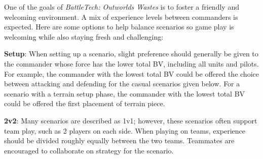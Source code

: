 One of the goals of \emph{BattleTech: Outworlds Wastes} is to foster a friendly and welcoming environment.
A mix of experience levels between commanders is expected.
Here are some options to help balance scenarios so game play is welcoming while also staying fresh and challenging:

\begin{description}

\item {\bfseries Setup}: When setting up a scenario, slight preference should generally be given to the commander whose force has the lower total BV, including all units and pilots.
For example, the commander with the lowest total BV could be offered the choice between attacking and defending for the casual scenarios given below.
For a scenario with a terrain setup phase, the commander with the lowest total BV could be offered the first placement of terrain piece.

\item {\bfseries 2v2}: Many scenarios are described as 1v1; however, these scenarios often support team play, such as 2 players on each side.
When playing on teams, experience should be divided roughly equally between the two teams.
Teammates are encouraged to collaborate on strategy for the scenario.

\end{description}
